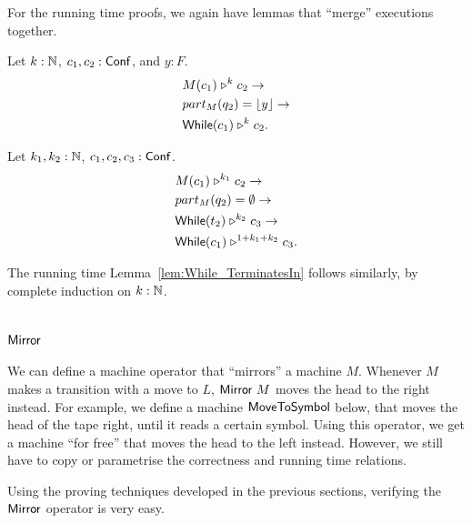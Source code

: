 For the running time proofs, we again have lemmas that ``merge'' executions together.

\begin{lemma}
  Let $k : \mathbb{N}$, $c_1, c_2 : \mathsf{Conf}$, and $y:F$.
  \begin{alignat*}{1}
    & M(c_1) \mathrel{\triangleright}^k c_2 \rightarrow \\
    & part_M(q_2) = \left\lfloor {y} \right\rfloor \rightarrow \\
    & \mathsf{While}(c_1) \mathrel{\triangleright}^k c_2.
  \end{alignat*}
\end{lemma}
\begin{lemma}
  Let $k_1, k_2 : \mathbb{N}$, $c_1, c_2, c_3 : \mathsf{Conf}$.
  \begin{alignat*}{1}
    & M(c_1) \mathrel{\triangleright}^{k_1} c_2 \rightarrow \\
    & part_M(q_2) = \emptyset \rightarrow \\
    & \mathsf{While}(t_2) \mathrel{\triangleright}^{k_2} c_3 \rightarrow \\
    & \mathsf{While}(c_1) \mathrel{\triangleright}^{1+k_1+k_2} c_3.
  \end{alignat*}
\end{lemma}

The running time Lemma~\ref{lem:While_TerminatesIn} follows similarly, by complete induction on $k:\mathbb{N}$.



\section{$\mathsf{Mirror}$}
\label{sec:mirror}

We can define a machine operator that ``mirrors'' a machine $M$.  Whenever $M$ makes a transition with a move to $L$, $\mathsf{Mirror}~M$ moves the head
to the right instead.  For example, we define a machine $\mathsf{MoveToSymbol}$ below, that moves the head of the tape right, until it reads a certain
symbol.  Using this operator, we get a machine ``for free'' that moves the head to the left instead.  However, we still have to copy or parametrise
the correctness and running time relations.

Using the proving techniques developed in the previous sections, verifying the $\mathsf{Mirror}$ operator is very easy.

